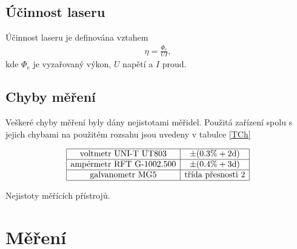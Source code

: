 \documentclass[a4paper,12pt]{article}
\begin{document}
\subsection{Účinnost laseru}
Účinnost laseru je definována vztahem
\begin{eqnarray}
\eta=\frac{\Phi_e}{UI},
\label{eta}
\end{eqnarray}
kde $\Phi_e$ je vyzařovaný výkon, $U$ napětí a $I$ proud.

\subsection{Chyby měření}
Veškeré chyby měření byly dány nejistotami měřidel. Použitá zařízení spolu s jejich chybami na použitém rozsahu jsou uvedeny v tabulce \ref{TCh}

\begin{table}
$$
\begin{array}{|c|c|}
\hline
\mbox{voltmetr UNI-T UT803}&  \pm (0.3 \% + 2\mbox{d}) \\ \hline
\mbox{ampérmetr RFT G-1002.500}&  \pm (0.4 \% + 3\mbox{d}) \\ \hline
\mbox{galvanometr MG5}& \mbox{třída přesnosti}\ 2 \\ \hline    
\end{array}
$$
\caption{Nejistoty měřících přístrojů.}
\label{TCh}
\end{table}

\section{Měření}
\end{document}

